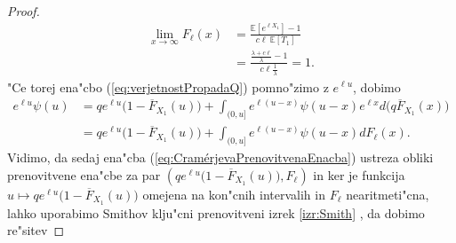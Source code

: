 \documentclass[12pt, a4paper, reqno]{amsart}
\theoremstyle{definition}
\theoremstyle{plain}
\newcommand{\E}{\mathbb{E}}
\newcommand{\1}{\mathds{1}}
\newcommand*{\refPriloga}[1]{%
  \begingroup
    \hypersetup{
      linkcolor=properpurple,
      linkbordercolor=properpurple,
    }%
    \ref{#1}%
  \endgroup
}
\begin{document}
\begin{proof}
                \begin{align*}
                    \lim_{x\to\infty}F_\ell(x)  &= \frac{\E\left[e^{\ell X_1}\right] - 1}{c\ell\ \E\left[T_1\right]}\\
                                                &= \frac{\frac{\lambda + c\ell}{\lambda} - 1}{c\ell \frac{1}{\lambda}} = 1.
                \end{align*}
                "Ce torej ena"cbo (\ref{eq:verjetnostPropadaQ}) pomno"zimo z $e^{\ell u}$, dobimo
                \begin{align}
                    e^{\ell u}\psi(u)   &= qe^{\ell u}\bigl(1 - \overline{F}_{X_1}(u)\bigr) + \int_{(0, u]}e^{\ell (u - x)}\psi(u - x)e^{\ell x}d\bigl(q\overline{F}_{X_1}(x)\bigr) \nonumber \\
                                        &= qe^{\ell u}\bigl(1 - \overline{F}_{X_1}(u)\bigr) + \int_{(0, u]}e^{\ell (u - x)}\psi(u - x)dF_\ell(x). \label{eq:CramérjevaPrenovitvenaEnacba}
                \end{align}
                Vidimo, da sedaj ena"cba (\ref{eq:CramérjevaPrenovitvenaEnacba}) ustreza obliki prenovitvene ena"cbe za par \newline $\left(qe^{\ell u}\bigl(1 - \overline{F}_{X_1}(u)\bigr), F_\ell\right)$
                in ker je funkcija $u\mapsto qe^{\ell u}\bigl(1 - \overline{F}_{X_1}(u)\bigr)$ omejena na kon"cnih 
                intervalih in $F_\ell$ nearitmeti"cna, lahko uporabimo Smithov klju"cni prenovitveni izrek \refPriloga{izr:Smith}, da dobimo
                re"sitev
                

\end{proof}
\end{document}
